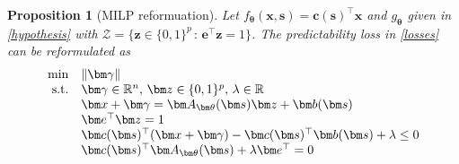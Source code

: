 \documentclass{article}
\theoremstyle{plain}
\newtheorem{proposition}[theorem]{Proposition}
\begin{document}
\begin{proposition}[MILP reformuation]
\label{prop:milp}
Let $f_{\bm\theta}(\bm x, \bm s) = \bm c(\bm s)^\top \bm x$ and $g_{\bm\theta}$ given in \eqref{hypothesis} with $\mathcal{Z} = \{\bm z\in\{0,1\}^p\,:\,\bm e^\top \bm z = 1\}$. The predictability loss in \eqref{losses} can be reformulated as
\begin{equation}\label{reform:bilinear1}
     \begin{array}{rl}
     \displaystyle\min  & \|\bm \gamma\|\\
   \textnormal{s.t.} & \bm \gamma\in\mathbb{R}^n,\, \bm z \in \{0,1\}^p,\,  \lambda\in\mathbb{R}\\
&\bm x+\bm \gamma  = \bm A_{\bm\theta}(\bm s)\bm z+\bm b(\bm s)\\ 
&\bm e^\top \bm z = 1\\
    & \bm c(\bm s)^\top(\bm x+\bm\gamma) - \bm c(\bm s)^\top\bm b(\bm s) +  \lambda\leq 0\\
    & \bm c(\bm s)^\top\bm A_{\bm\theta}(\bm s) +   \lambda  \bm e^\top = 0\\
    \end{array}
\end{equation}
\end{proposition}
\end{document}
